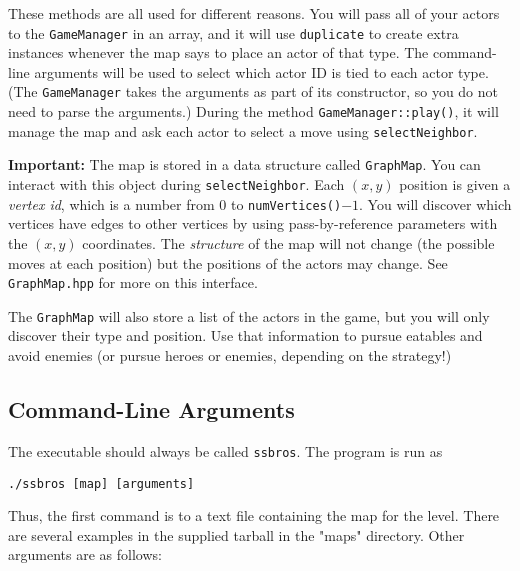 \documentclass[11pt]{article}
\begin{document}
These methods are all used for different reasons.
You will pass all of your actors to the \texttt{GameManager} in an array, and it will use \texttt{duplicate} to create extra instances whenever the map says to place an actor of that type.
The command-line arguments will be used to select which actor ID is tied to each actor type.
(The \texttt{GameManager} takes the arguments as part of its constructor, so you do not need to parse the arguments.)
During the method \texttt{GameManager::play()}, it will manage the map and ask each actor to select a move using \texttt{selectNeighbor}.

\textbf{Important:} The map is stored in a data structure called \texttt{GraphMap}.
You can interact with this object during \texttt{selectNeighbor}. 
Each $(x,y)$ position is given a \emph{vertex id}, which is a number from $0$ to \texttt{numVertices()}$-1$.
You will discover which vertices have edges to other vertices by using pass-by-reference parameters with the $(x,y)$ coordinates.
The \emph{structure} of the map will not change (the possible moves at each position) but the positions of the actors may change.
See \texttt{GraphMap.hpp} for more on this interface.

The \texttt{GraphMap} will also store a list of the actors in the game, but you will only discover their type and position.
Use that information to pursue eatables and avoid enemies (or pursue heroes or enemies, depending on the strategy!)

\subsection{Command-Line Arguments}

The executable should always be called \texttt{ssbros}.
The program is run as
\begin{center}
\texttt{./ssbros [map] [arguments]}
\end{center}

Thus, the first command is to a text file containing the map for the level. There are several examples in the supplied tarball in the "maps" directory.
Other arguments are as follows:
\end{document}
